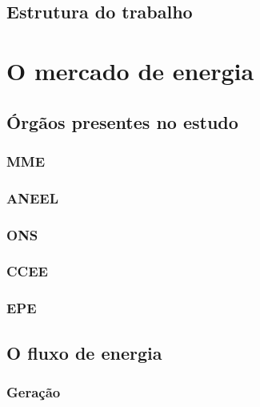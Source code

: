 \documentclass[grad,numbers]{coppe}
\begin{document}
  \hypertarget{estrutura-do-trabalho}{%
  \section{Estrutura do trabalho}\label{estrutura-do-trabalho}}
  
  \hypertarget{o-mercado-de-energia}{%
  \chapter{O mercado de energia}\label{o-mercado-de-energia}}
  
  \hypertarget{uxf3rguxe3os-presentes-no-estudo}{%
  \section{Órgãos presentes no estudo}\label{uxf3rguxe3os-presentes-no-estudo}}
  
  \hypertarget{mme}{%
  \subsection{MME}\label{mme}}
  
  \hypertarget{aneel}{%
  \subsection{ANEEL}\label{aneel}}
  
  \hypertarget{ons}{%
  \subsection{ONS}\label{ons}}
  
  \hypertarget{ccee}{%
  \subsection{CCEE}\label{ccee}}
  
  \hypertarget{epe}{%
  \subsection{EPE}\label{epe}}
  
  \hypertarget{o-fluxo-de-energia}{%
  \section{O fluxo de energia}\label{o-fluxo-de-energia}}
  
  \hypertarget{gerauxe7uxe3o}{%
  \subsection{Geração}\label{gerauxe7uxe3o}}
  
\end{document}
